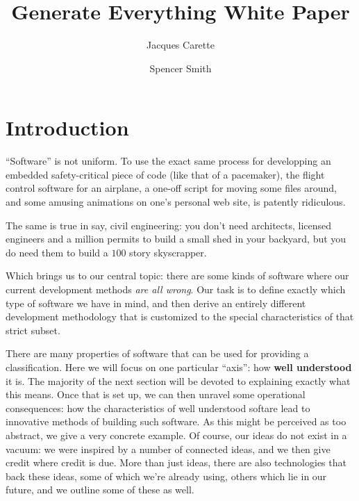 \documentclass[10pt,twoside,onecolumn,openany,letterpaper]{memoir}
\begin{document}
\title{Generate Everything White Paper}
\author{Jacques Carette \and Spencer Smith}



\newtheorem{defn}{Definition}

\maketitle

\chapter{Introduction}

``Software'' is not uniform. To use the exact same process for
developping an embedded safety-critical piece of code (like that of
a pacemaker), the flight control software for an airplane, a one-off
script for moving some files around, and some amusing animations on
one's personal web site, is patently ridiculous.

The same is true in say, civil engineering: you don't need architects,
licensed engineers and a million permits to build a small shed in your
backyard, but you do need them to build a $100$ story skyscrapper.

Which brings us to our central topic: there are some kinds of software
where our current development methods \emph{are all wrong}. Our task
is to define exactly which type of software we have in mind, and then
derive an entirely different development methodology that is
customized to the special characteristics of that strict subset.

There are many properties of software that can be used for providing
a classification. Here we will focus on one particular ``axis'': how
\textbf{well understood} it is. The majority of the next section will
be devoted to explaining exactly what this means. Once that is set up,
we can then unravel some operational consequences: how the characteristics of
well understood softare lead to innovative methods of building such
software. As this might be perceived as too abstract, we give a very
concrete example. Of course, our ideas do not exist in a vacuum: we were
inspired by a number of connected ideas, and we then give credit where
credit is due. More than just ideas, there are also technologies that back
these ideas, some of which we're already using, others which lie in our
future, and we outline some of these as well.
\end{document}
